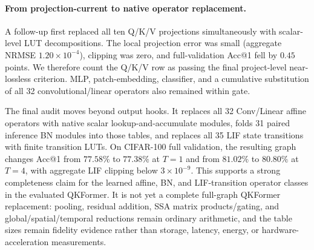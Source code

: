 \paragraph{From projection-current to native operator replacement.}
A follow-up first replaced all ten Q/K/V projections simultaneously with
scalar-level LUT decompositions. The local projection error was small
(aggregate NRMSE $1.20\times10^{-4}$), clipping was zero, and full-validation
Acc@1 fell by $0.45$ points. We therefore count the Q/K/V row as passing the
final project-level near-lossless criterion. MLP, patch-embedding, classifier,
and a cumulative substitution of all 32 convolutional/linear operators also
remained within gate.

The final audit moves beyond output hooks. It replaces all 32
Conv/Linear affine operators with native scalar lookup-and-accumulate modules,
folds 31 paired inference BN modules into those tables, and replaces all 35
LIF state transitions with finite transition LUTs. On CIFAR-100 full
validation, the resulting graph changes Acc@1 from $77.58\%$ to $77.38\%$ at
$T=1$ and from $81.02\%$ to $80.80\%$ at $T=4$, with aggregate LIF clipping
below $3\times10^{-9}$. This supports a strong completeness claim for the
learned affine, BN, and LIF-transition operator classes in the evaluated
QKFormer. It is not yet a complete full-graph QKFormer replacement: pooling,
residual addition, SSA matrix products/gating, and global/spatial/temporal
reductions remain ordinary arithmetic, and the table sizes remain fidelity
evidence rather than storage, latency, energy, or hardware-acceleration
measurements.
